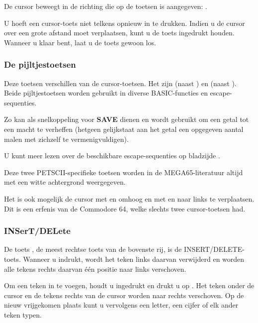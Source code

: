 De cursor beweegt in de richting die op de toetsen is aangegeven: \megakey{$\leftarrow$} \megakey{$\uparrow$} \megakey{$\rightarrow$} \megakey{$\downarrow$}.

U hoeft een cursor-toets niet telkens opnieuw in te drukken. Indien u de cursor over een grote afstand moet verplaatsen, kunt u de toets ingedrukt houden. Wanneer u klaar bent, laat u de toets gewoon los.

\subsubsection{De pijltjestoetsen}
Deze toetsen verschillen van de cursor-toetsen. Het zijn \megakeywhite{$\leftarrow$} (naast ) en \megakeywhite{$\uparrow$} (naast ). Beide pijltjestoetsen worden gebruikt in diverse BASIC-functies en escape-sequenties.

Zo kan \megakeywhite{$\leftarrow$} als snelkoppeling voor {\bf SAVE} dienen en wordt \megakeywhite{$\uparrow$} gebruikt om een getal tot een macht te verheffen (hetgeen gelijkstaat aan het getal een opgegeven aantal malen met zichzelf te vermenigvuldigen).

U kunt meer lezen over de beschikbare escape-sequenties op bladzijde \pageref{escape-sequences}.

Deze twee PETSCII-specifieke toetsen worden in de MEGA65-literatuur altijd met een witte achtergrond weergegeven.

Het is ook mogelijk de cursor met  en \megakey{$\downarrow$} omhoog en met  en \megakey{$\rightarrow$} naar links te verplaatsen. Dit is een erfenis van de Commodore 64, welke slechts twee cursor-toetsen had.

\subsubsection{INSerT/DELete}
De toets , de meest rechtse toets van de bovenste rij, is de INSERT/DELETE-toets. Wanneer u  indrukt, wordt het teken links daarvan verwijderd en worden alle tekens rechts daarvan één positie naar links verschoven.

Om een teken in te voegen, houdt u  ingedrukt en drukt u op . Het teken onder de cursor en de tekens rechts van de cursor worden naar rechts verschoven. Op de nieuw vrijgekomen plaats kunt u vervolgens een letter, een cijfer of elk ander teken typen.


